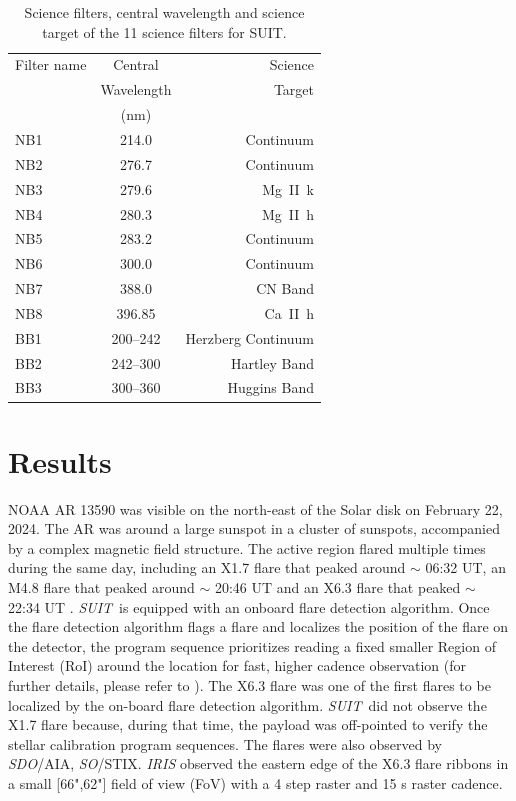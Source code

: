 \documentclass[lineno, pdflatex,sn-mathphys-ay]{sn-jnl}%
\newcommand{\suit}{{\it{SUIT}}}
\newcommand{\arcsec}{"}
\begin{document}
\begin{table}
\centering
\begin{tabular}{lcr}
\hline
Filter name 	& Central 		    		 & Science\\
		& Wavelength	    	&         Target\\
		& (nm)			    	&          \\
\hline
NB1 		& 214.0                 			&Continuum\\
NB2 		& 276.7 		       			&Continuum\\
NB3 		& 279.6 			   			&Mg~\rm{II}~k\\
NB4 		& 280.3 			   			&Mg~\rm{II}~h\\
NB5 		& 283.2 			   			&Continuum\\
NB6 		& 300.0   			   			&Continuum\\
NB7 		& 388.0   			   			&CN Band\\ 
NB8 		& 396.85 			  				&Ca~\rm{II}~h\\
BB1 		& 200{--}242 		   			&Herzberg Continuum\\
BB2 		& 242{--}300 		   			&Hartley Band\\
BB3 		& 300{--}360 		   			&Huggins Band\\
\hline
\end{tabular}
\caption{Science filters, central wavelength and science target of the 11 science filters for SUIT.} 
\label{sc_comb_fil}
\end{table}

\section*{Results}\label{sec:result}

NOAA AR 13590 was visible on the north-east of the Solar disk on February 22, 2024. The AR was around a large sunspot in a cluster of sunspots, accompanied by a complex magnetic field structure. The active region flared multiple times during the same day, including an X1.7 flare that peaked around $\sim$ 06:32 UT, an M4.8 flare that peaked around $\sim$ 20:46 UT and an X6.3 flare that peaked $\sim$ 22:34 UT . \suit~is equipped with an onboard flare detection algorithm. Once the flare detection algorithm flags a flare and localizes the position of the flare on the detector, the program sequence prioritizes reading a fixed smaller Region of Interest (RoI) around the location for fast, higher cadence observation (for further details, please refer to \cite{flare_det}). The X6.3 flare was one of the first flares to be localized by the on-board flare detection algorithm. \suit~did not observe the X1.7 flare because, during that time, the payload was off-pointed to verify the stellar calibration program sequences. The flares were also observed by {\it SDO}/AIA, {\it SO}/STIX. {\it IRIS} observed the eastern edge of the X6.3 flare ribbons in a small [66\arcsec,62\arcsec] field of view (FoV) with a 4 step raster and 15 s raster cadence.
\end{document}
